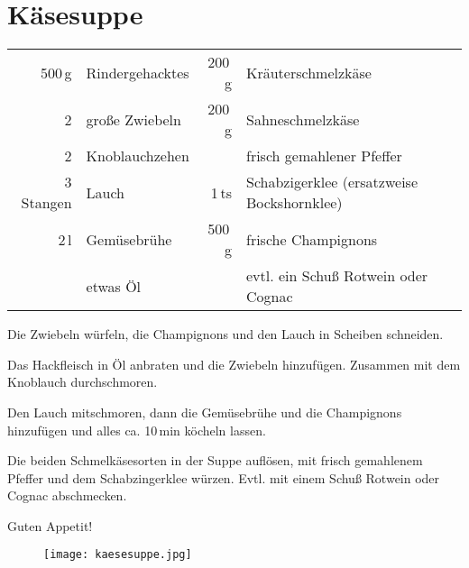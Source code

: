 \section*{Käsesuppe}
\begin{centering}

\end{centering}
\begin{table}[H]
\centering
\begin{tabular*}{1\textwidth}{rlrl}
500\,g & Rindergehacktes &200\,g & Kräuterschmelzkäse \\
2 & große Zwiebeln & 200\,g & Sahneschmelzkäse \\
2 & Knoblauchzehen & & frisch gemahlener Pfeffer \\
3 Stangen & Lauch & 1\,ts &Schabzigerklee (ersatzweise Bockshornklee) \\
2\,l & Gemüsebrühe &500\,g & frische Champignons \\
 & etwas Öl & & evtl. ein Schuß Rotwein oder Cognac\\
\end{tabular*}
\end{table}
\begin{Notes}
\item Die Zwiebeln würfeln, die Champignons und den Lauch in Scheiben schneiden. 
\item Das Hackfleisch in Öl anbraten und die Zwiebeln hinzufügen. Zusammen mit dem Knoblauch durchschmoren.
\item Den Lauch mitschmoren, dann die Gemüsebrühe und die Champignons hinzufügen und alles ca. 10\,min köcheln lassen.
\item Die beiden Schmelkäsesorten in der Suppe auflösen, mit frisch gemahlenem Pfeffer und dem Schabzingerklee würzen. Evtl. mit einem Schuß Rotwein oder Cognac abschmecken.  
\end{Notes}
Guten Appetit!
\vfill
\begin{figure}[H]
  \centering
  \texttt{[image: kaesesuppe.jpg]}
\end{figure}
\newpage
